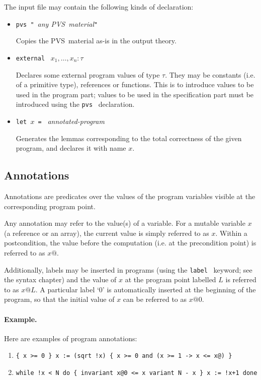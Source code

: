 \documentclass[a4paper,12pt]{report}
\newcommand{\pvs}{\textsf{PVS}}
\newcommand{\te}[1]{\texttt{#1}~}
\begin{document}
The input file may contain the following kinds of declaration:
\begin{itemize}
  \item \te{pvs "}\textit{any \pvs\ material}\te{"} \par
    Copies the \pvs\ material as-is in the output theory.

  \item \te{external} $x_1,\dots,x_n: \tau$ \par 
    Declares some external program values of type $\tau$.
    They may be constants (i.e. of a primitive type), references 
    or functions. This is to introduce values to be used
    in the program part; values to be used in the specification part
    must be introduced using the \te{pvs} declaration.

  \item \te{let $x$ =} \textit{annotated-program} \par
    Generates the lemmas corresponding to the total correctness of
    the given program, and declares it with name $x$.
\end{itemize}

\subsection{Annotations}

Annotations are predicates over the values of the program variables
visible at the corresponding program point.

Any annotation may refer to the value(s) of a variable.  For a mutable
variable $x$ (a reference or an array), the current value is simply
referred to as $x$. Within a postcondition, the value before the
computation (i.e. at the precondition point) is referred to as $x@$.

Additionally, labels may be inserted in programs (using the 
\te{label} keyword; see the syntax chapter) and the value of $x$ at the
program point labelled $L$ is referred to as $x@L$.
A particular label `0' is automatically inserted at the beginning of the 
program, so that the initial value of $x$ can be referred to as $x@0$.

\paragraph{Example.} Here are examples of program annotations:
\begin{enumerate}
\item
  \verb#{ x >= 0 } x := (sqrt !x) { x >= 0 and (x >= 1 -> x <= x@) }# 
\item
  \verb#while !x < N do { invariant x@0 <= x variant N - x } x := !x+1 done#
\end{enumerate}
\end{document}
